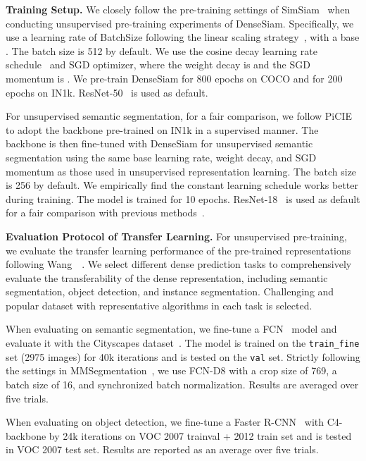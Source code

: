 \documentclass[runningheads]{llncs}
\newcommand{\myparagraph}[1]{{\noindent\bf #1}}
\begin{document}
\myparagraph{Training Setup.}
We closely follow the pre-training settings of SimSiam~\cite{simsiam} when conducting unsupervised pre-training experiments of DenseSiam.
Specifically, we use a learning rate of BatchSize following the linear scaling strategy~\cite{in_1hour}, with a base .
The batch size is 512 by default.
We use the cosine decay learning rate schedule~\cite{SGDR} and SGD optimizer, where the weight decay is  and the SGD momentum is .
We pre-train DenseSiam for 800 epochs on COCO and for 200 epochs on IN1k.
ResNet-50~\cite{resnet} is used as default.

For unsupervised semantic segmentation, for a fair comparison, we follow PiCIE~\cite{picie} to adopt the backbone pre-trained on IN1k in a supervised manner.
The backbone is then fine-tuned with DenseSiam for unsupervised semantic segmentation using the same base learning rate, weight decay, and SGD momentum
as those used in unsupervised representation learning. The batch size is 256 by default.
We empirically find the constant learning schedule works better during training. The model is trained for 10 epochs.
ResNet-18~\cite{resnet} is used as default for a fair comparison with previous methods~\cite{picie}.

\myparagraph{Evaluation Protocol of Transfer Learning.}
For unsupervised pre-training, we evaluate the transfer learning performance of the pre-trained representations following Wang~\etal~\cite{densecl}.
We select different dense prediction tasks to comprehensively evaluate the transferability of the dense representation, including semantic segmentation, object detection, and instance segmentation.
Challenging and popular dataset with representative algorithms in each task is selected.

When evaluating on semantic segmentation, we fine-tune a FCN~\cite{FCN} model and evaluate it with the Cityscapes dataset~\cite{cityscapes}.
The model is trained on the \texttt{train\_fine} set (2975 images) for 40k iterations and is tested on the \texttt{val} set.
Strictly following the settings in MMSegmentation~\cite{mmseg2020}, we use FCN-D8 with a crop size of 769, a batch size of 16, and synchronized batch normalization.
Results are averaged over five trials.

When evaluating on object detection, we fine-tune a Faster R-CNN~\cite{ren2015faster} with C4-backbone by 24k iterations on VOC 2007 trainval + 2012 train set and is tested in VOC 2007 test set.
Results are reported as an average over five trials.
\end{document}
